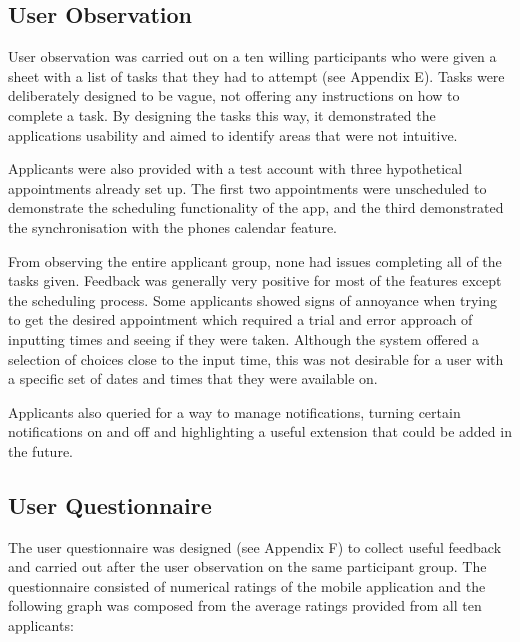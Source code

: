 \subsection{User Observation}

User observation was carried out on a ten willing participants who were given a sheet with a list of tasks that they had to attempt (see Appendix E). Tasks were deliberately designed to be vague, not offering any instructions on how to complete a task. By designing the tasks this way, it demonstrated the applications usability and aimed to identify areas that were not intuitive.

Applicants were also provided with a test account with three hypothetical appointments already set up. The first two appointments were unscheduled to demonstrate the scheduling functionality of the app, and the third demonstrated the synchronisation with the phones calendar feature.

From observing the entire applicant group, none had issues completing all of the tasks given. Feedback was generally very positive for most of the features except the scheduling process. Some applicants showed signs of annoyance when trying to get the desired appointment which required a trial and error approach of inputting times and seeing if they were taken. Although the system offered a selection of choices close to the input time, this was not desirable for a user with a specific set of dates and times that they were available on.

Applicants also queried for a way to manage notifications, turning certain notifications on and off and highlighting a useful extension that could be added in the future.

\subsection{User Questionnaire}

The user questionnaire was designed (see Appendix F) to collect useful feedback and carried out after the user observation on the same participant group. The questionnaire consisted of numerical ratings of the mobile application and the following graph was composed from the average ratings provided from all ten applicants:

